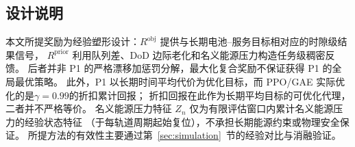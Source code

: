 \documentclass[a4paper,11pt]{article}
\begin{document}
\subsection{设计说明}

本文所提奖励为经验塑形设计：$R^{\mathrm{obj}}$ 提供与长期电池--服务目标相对应的时隙级结果信号，
$R^{\mathrm{prior}}$ 利用队列差、DoD 边际老化和名义能源压力构造任务级稠密反馈。
后者并非 P1 的严格漂移加惩罚分解，最大化复合奖励不保证获得 P1 的全局最优策略。
此外，P1 以长期时间平均代价为优化目标，而 PPO/GAE 实际优化的是$\gamma=0.99$的折扣累计回报；
折扣回报在此作为长期平均目标的可优化代理，二者并不严格等价。
名义能源压力特征 $Z_n$ 仅为有限评估窗口内累计名义能源压力的经验状态特征
（于每轨道周期起始复位），不承担长期能源约束或物理安全保证。
所提方法的有效性主要通过第~\ref{sec:simulation}~节的经验对比与消融验证。





\end{document}

